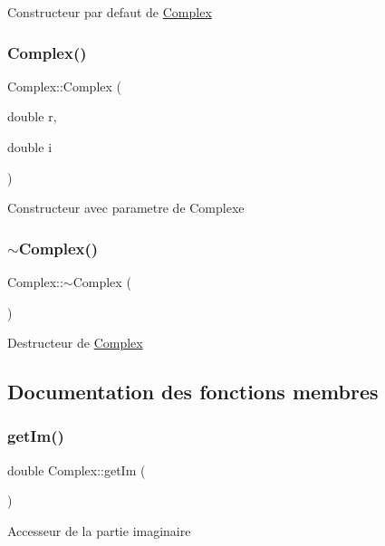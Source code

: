Constructeur par defaut de \hyperlink{classComplex}{Complex} \mbox{\label{classComplex_af56593c9b976452fd1480c1cc9e7a8c7}} 
\subsubsection{\texorpdfstring{Complex()}{Complex()}\hspace{0.1cm}{\footnotesize\ttfamily [2/2]}}
{\footnotesize\ttfamily Complex\+::\+Complex (\begin{DoxyParamCaption}\item[{double}]{r,  }\item[{double}]{i }\end{DoxyParamCaption})}

Constructeur avec parametre de Complexe \mbox{\label{classComplex_a70e14b17c92e3da779686b98f9f3bb2d}} 
\subsubsection{\texorpdfstring{$\sim$\+Complex()}{~Complex()}}
{\footnotesize\ttfamily Complex\+::$\sim$\+Complex (\begin{DoxyParamCaption}{ }\end{DoxyParamCaption})}

Destructeur de \hyperlink{classComplex}{Complex} 

\subsection{Documentation des fonctions membres}
\mbox{\label{classComplex_adb777696a6536bae109ce0b1380493cb}} 
\subsubsection{\texorpdfstring{get\+Im()}{getIm()}}
{\footnotesize\ttfamily double Complex\+::get\+Im (\begin{DoxyParamCaption}{ }\end{DoxyParamCaption})}

Accesseur de la partie imaginaire \mbox{\label{classComplex_a5d7b502023f614df92f597f65b081de0}} 
